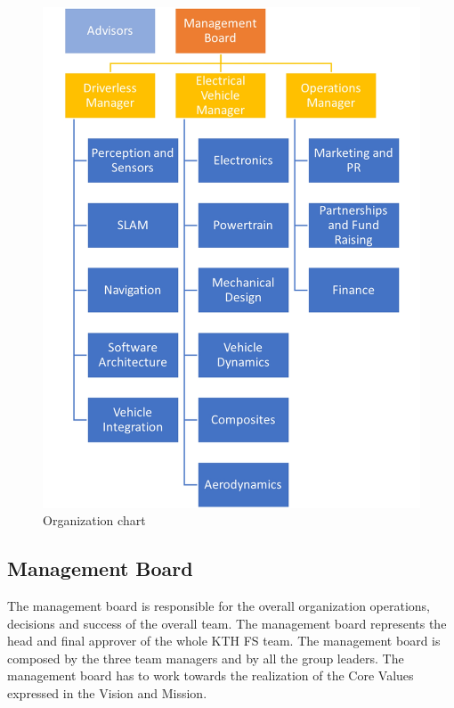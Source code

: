 \documentclass[graybox]{svmult}
\begin{document}
\begin{figure}
    \centering
    \includegraphics[scale=.60]{organigramma.jpg}
    \caption{Organization chart}
    \label{fig:chart}
\end{figure}

\subsection{Management Board}
The management board is responsible for the overall organization operations, decisions and success of the overall team. The management board represents the head and final approver of the whole KTH FS team. The management board is composed by the three team managers and by all the group leaders. The management board has to work towards the realization of the Core Values expressed in the Vision and Mission.
\end{document}
